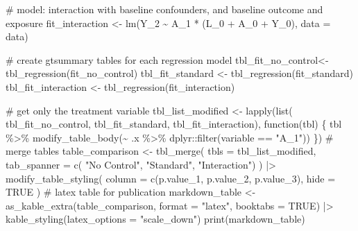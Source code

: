 \documentclass[
  singlecolumn]{article}
\newenvironment{Shaded}{}{}
\newcommand{\AttributeTok}[1]{\textcolor[rgb]{0.84,0.23,0.29}{#1}}
\newcommand{\CommentTok}[1]{\textcolor[rgb]{0.42,0.45,0.49}{#1}}
\newcommand{\ConstantTok}[1]{\textcolor[rgb]{0.00,0.36,0.77}{#1}}
\newcommand{\ControlFlowTok}[1]{\textcolor[rgb]{0.84,0.23,0.29}{#1}}
\newcommand{\FunctionTok}[1]{\textcolor[rgb]{0.44,0.26,0.76}{#1}}
\newcommand{\NormalTok}[1]{\textcolor[rgb]{0.14,0.16,0.18}{#1}}
\newcommand{\OtherTok}[1]{\textcolor[rgb]{0.44,0.26,0.76}{#1}}
\newcommand{\SpecialCharTok}[1]{\textcolor[rgb]{0.00,0.36,0.77}{#1}}
\newcommand{\StringTok}[1]{\textcolor[rgb]{0.01,0.18,0.38}{#1}}
\begin{document}
\begin{Shaded}
\begin{Highlighting}[]
\CommentTok{\# model: interaction with baseline confounders, and baseline outcome and exposure}
\NormalTok{fit\_interaction  }\OtherTok{\textless{}{-}} \FunctionTok{lm}\NormalTok{(Y\_2 }\SpecialCharTok{\textasciitilde{}}\NormalTok{ A\_1 }\SpecialCharTok{*}\NormalTok{ (L\_0 }\SpecialCharTok{+}\NormalTok{ A\_0 }\SpecialCharTok{+}\NormalTok{ Y\_0), }\AttributeTok{data =}\NormalTok{ data)}

\CommentTok{\# create gtsummary tables for each regression model}
\NormalTok{tbl\_fit\_no\_control}\OtherTok{\textless{}{-}} \FunctionTok{tbl\_regression}\NormalTok{(fit\_no\_control)  }
\NormalTok{tbl\_fit\_standard }\OtherTok{\textless{}{-}} \FunctionTok{tbl\_regression}\NormalTok{(fit\_standard)}
\NormalTok{tbl\_fit\_interaction }\OtherTok{\textless{}{-}} \FunctionTok{tbl\_regression}\NormalTok{(fit\_interaction)}

\CommentTok{\# get only the treatment variable}
\NormalTok{tbl\_list\_modified }\OtherTok{\textless{}{-}} \FunctionTok{lapply}\NormalTok{(}\FunctionTok{list}\NormalTok{(}
\NormalTok{  tbl\_fit\_no\_control,}
\NormalTok{  tbl\_fit\_standard,}
\NormalTok{  tbl\_fit\_interaction),}
\ControlFlowTok{function}\NormalTok{(tbl) \{}
\NormalTok{  tbl }\SpecialCharTok{\%\textgreater{}\%}
    \FunctionTok{modify\_table\_body}\NormalTok{(}\SpecialCharTok{\textasciitilde{}}\NormalTok{ .x }\SpecialCharTok{\%\textgreater{}\%}\NormalTok{ dplyr}\SpecialCharTok{::}\FunctionTok{filter}\NormalTok{(variable }\SpecialCharTok{==} \StringTok{"A\_1"}\NormalTok{))}
\NormalTok{\})}
\CommentTok{\# merge tables}
\NormalTok{table\_comparison }\OtherTok{\textless{}{-}} \FunctionTok{tbl\_merge}\NormalTok{(}
  \AttributeTok{tbls =}\NormalTok{ tbl\_list\_modified,}
  \AttributeTok{tab\_spanner =} \FunctionTok{c}\NormalTok{(}
    \StringTok{"No Control"}\NormalTok{,}
    \StringTok{"Standard"}\NormalTok{,}
    \StringTok{"Interaction"}\NormalTok{)}
\NormalTok{) }\SpecialCharTok{|\textgreater{}}
  \FunctionTok{modify\_table\_styling}\NormalTok{(}
    \AttributeTok{column =} \FunctionTok{c}\NormalTok{(p.value\_1, p.value\_2, p.value\_3),}
    \AttributeTok{hide =} \ConstantTok{TRUE}
\NormalTok{  )}
\CommentTok{\# latex table for publication}
\NormalTok{markdown\_table }\OtherTok{\textless{}{-}}
  \FunctionTok{as\_kable\_extra}\NormalTok{(table\_comparison, }\AttributeTok{format =} \StringTok{"latex"}\NormalTok{, }\AttributeTok{booktabs =} \ConstantTok{TRUE}\NormalTok{) }\SpecialCharTok{|\textgreater{}}
  \FunctionTok{kable\_styling}\NormalTok{(}\AttributeTok{latex\_options =} \StringTok{"scale\_down"}\NormalTok{)}
\FunctionTok{print}\NormalTok{(markdown\_table)}
\end{Highlighting}
\end{Shaded}
\end{document}
